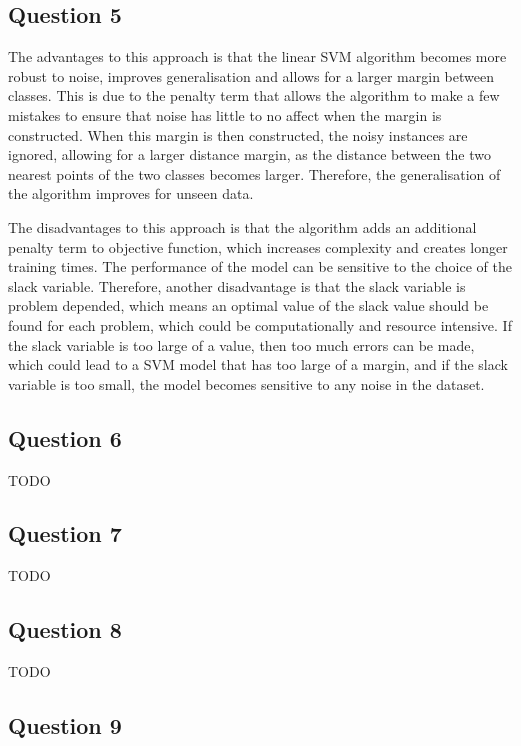 \documentclass[10pt]{article}
\begin{document}
\subsection*{Question 5}

The advantages to this approach is that the linear SVM algorithm becomes more robust to noise,
improves generalisation and allows for a larger margin between classes. This is due to the penalty term
that allows the algorithm to make a few mistakes to ensure that noise has little to no affect when the
margin is constructed. When this margin is then constructed, the noisy instances are ignored, allowing
for a larger distance margin, as the distance between the two nearest points of the two classes becomes
larger. Therefore, the generalisation of the algorithm improves for unseen data.

The disadvantages to this approach is that the algorithm adds an additional penalty term
to objective function, which increases complexity and creates longer training times.
The performance of the model can be sensitive to the choice of the slack variable. Therefore, another disadvantage
is that the slack variable is problem depended, which means an optimal value of the slack value should
be found for each problem, which could be computationally and resource intensive. If the slack variable
is too large of a value, then too much errors can be made, which could lead to a SVM model that has
too large of a margin, and if the slack variable is too small, the model becomes sensitive
to any noise in the dataset.

\subsection*{Question 6}

TODO 



\subsection*{Question 7}

TODO

\subsection*{Question 8}

TODO

\subsection*{Question 9}
\end{document}
